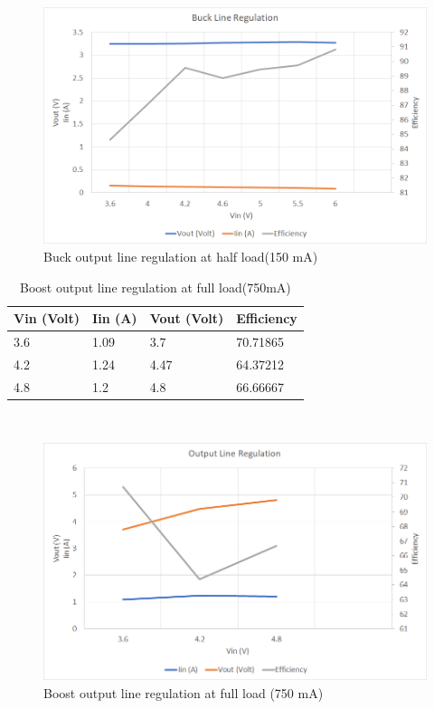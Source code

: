 \\
\begin{figure}[H]
	\centering
	\includegraphics[width=\columnwidth]{IMGS/Buck output line regulation at half load (150mA).png}
	\caption{Buck output line regulation at half load(150 mA)}
	\label{fig:arch}
\end{figure}
\pagebreak

\begin{table}[H]
\centering
\begin{tabular}{|l|l|l|l|}
\hline
Vin (Volt) & Iin (A) & Vout (Volt) & Efficiency \\ \hline
3.6        & 1.09    & 3.7         & 70.71865   \\ \hline
4.2        & 1.24    & 4.47        & 64.37212   \\ \hline
4.8        & 1.2     & 4.8         & 66.66667   \\ \hline
\end{tabular}
\caption{Boost output line regulation at full load(750mA)}
\label{table:4}
\end{table}
\\

\begin{figure}[H]
	\centering
	\includegraphics[width=\columnwidth]{IMGS/Boost output regulation at full load (750mA).png}
	\caption{Boost output line regulation at full load (750 mA)}
	\label{fig:arch}
\end{figure}
\pagebreak

